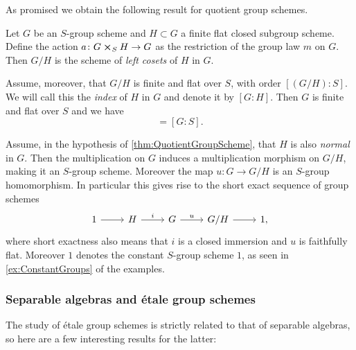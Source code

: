\documentclass[../Main]{subfiles}
\begin{document}
As promised we obtain the following result for quotient group schemes.
\begin{prop}\label{thm:QuotientGroupScheme}
	Let $G$ be an $S$-group scheme and $H \subset G$ a finite flat closed
	subgroup scheme.
	Define the action $a\colon G \cross_{ S } H \to G$ as the restriction of the
	group law $m$ on $G$.
	Then $G/H$ is the scheme of {\em left cosets} of $H$ in $G$.

	Assume, moreover, that $G/H$ is finite and flat over $S$,
	with order $[(G/H):S]$. We will call this the {\em index} of $H$ in $G$
	and denote it by $[G:H]$.
	Then $G$ is finite and flat over $S$ and we have
	\begin{equation*}
		[G:H][H:S] = [G:S]
	.\end{equation*} 
\end{prop}

\begin{rem}
	Assume, in the hypothesis of \cref{thm:QuotientGroupScheme}, that $H$ is
	also {\em normal} in $G$.
	Then the multiplication on $G$ induces a multiplication 
	morphism on $G/H$, making it an $S$-group scheme.
	Moreover the map $u\colon G \to G/H$ is
	an $S$-group homomorphism.
	In particular this gives rise to the short exact sequence of group schemes
	\begin{equation*}
	\begin{tikzcd}
		1 \arrow[r, "", rightarrow] &
		H \arrow[r, "i", rightarrow] &
		G \arrow[r, "u", rightarrow] &
		G/H \arrow[r, "", rightarrow] &
		1
	,\end{tikzcd}
	\end{equation*}
	where short exactness also means that $i$ is a closed immersion
	and $u$ is faithfully flat.
	Moreover $1$ denotes the constant $S$-group scheme $1$, as
	seen in \cref{ex:ConstantGroups} of the examples.
\end{rem}


\subsubsection{Separable algebras and étale group schemes}
The study of étale group schemes is strictly related to that of
separable algebras, so here are a few interesting results for the latter:
\end{document}
